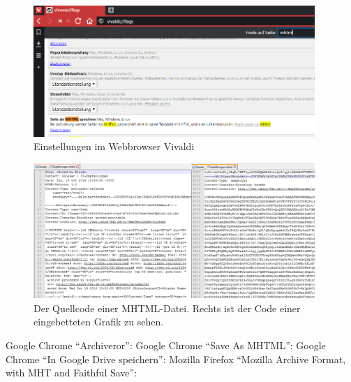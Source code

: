 \begin{figure}[h!tb]
  \begin{center}
    \includegraphics[width=0.95\textwidth]{bilder/web_vivaldi}
  \end{center}
  \caption{Einstellungen im Webbrowser Vivaldi}
\end{figure}

\begin{figure}[h!tb]
  \begin{center}
    \includegraphics[width=0.95\textwidth]{bilder/web_mhtml}
  \end{center}
  \caption{Der Quellcode einer MHTML-Datei. Rechts ist der Code einer eingebetteten Grafik zu sehen.}
\end{figure}


\begin{flushleft}
	Google Chrome "`Archiveror"': 
	Google Chrome "`Save As MHTML"': 
	Google Chrome "`In Google Drive speichern"': 
	Mozilla Firefox "`Mozilla Archive Format, with MHT and Faithful Save"': 
\end{flushleft}


